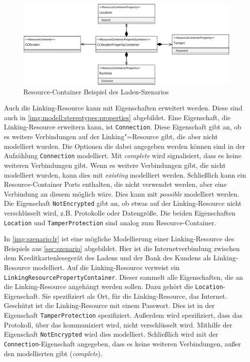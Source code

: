 \begin{figure}[h]
	\centering
  	\includegraphics[width=1\textwidth]{images/szenario_rc.png}
	\caption{Resource-Container Beispiel des Laden-Szenarios}
	\label{img:szenario:rc}
\end{figure}

Auch die Linking-Resource kann mit Eigenschaften erweitert werden. Diese sind auch in \autoref{img:modell:stereotypes:properties} abgebildet. Eine Eigenschaft, die Linking-Resource erweitern kann, ist \texttt{Connection}. Diese Eigenschaft gibt an, ob es weitere Verbindungen auf der Linking"=Resource gibt, die aber nicht modelliert wurden. Die Optionen die dabei angegeben werden können sind in der Aufzählung \texttt{Connection} modelliert. Mit \textit{complete} wird signalisiert, dass es keine weiteren Verbindungen gibt. Wenn es weitere Verbindungen gibt, die nicht modelliert wurden, kann dies mit \textit{existing} modelliert werden. Schließlich kann ein Resource-Container Ports enthalten, die nicht verwendet werden, aber eine Verbindung an diesem möglich wäre. Dies kann mit \textit{possible} modelliert werden. Die Eigenschaft \texttt{NotEncrypted} gibt an, ob etwas auf der Linking-Resource nicht verschlüsselt wird, z.B. Protokolle oder Datengröße. Die beiden Eigenschaften \texttt{Location} und \texttt{TamperProtection} sind analog zum Resource-Container. \par
In \autoref{img:szenario:lr} ist eine mögliche Modellierung einer Linking-Resource des Beispiels aus \autoref{sec:szenario} abgebildet. Hier ist die Internetverbindung zwischen dem Kreditkartenlesegerät des Ladens und der Bank des Kundens als Linking-Resource modelliert. Auf die Linking-Resource verweist ein \texttt{LinkingResourcePropertyContainer}. Dieser sammelt alle Eigenschaften, die an die Linking-Resource angehängt werden sollen. Dazu gehört die \texttt{Location}-Eigenschaft. Sie spezifiziert als Ort, für die Linking-Resource, das Internet. Geschützt ist die Linking-Resource mit einem Passwort. Dies ist in der Eigenschaft \texttt{TamperProtection} spezifiziert. Außerdem wird spezifiziert, dass das Protokoll, über das kommuniziert wird, nicht verschlüsselt wird. Mithilfe der Eigenschaft \texttt{NotEncrypted} wird dies modelliert. Schließlich wird mit der \texttt{Connection}-Eigenschaft angegeben, dass es keine weiteren Verbindungen, außer den modellierten gibt (\textit{complete}). 

